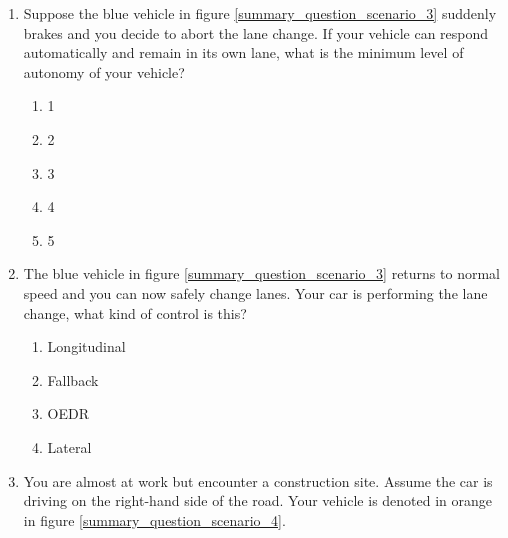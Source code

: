 \begin{enumerate}
\item  Suppose the blue vehicle in figure \ref{summary_question_scenario_3} suddenly brakes and you decide to abort the lane change. 
If your vehicle can respond automatically and remain in its own lane, what is the minimum level of autonomy of your vehicle?

\begin{enumerate}
\item 1
\item 2
\item 3
\item 4
\item 5
\end{enumerate}

\item The blue vehicle in figure \ref{summary_question_scenario_3} returns to normal speed and you can now safely change lanes. Your car is performing the lane change, what kind of control is this?

\begin{enumerate}
\item Longitudinal
\item Fallback
\item OEDR
\item Lateral
\end{enumerate}


\item You are almost at work but encounter a construction site. Assume the car is driving on the right-hand side of the road. 
Your vehicle is denoted in orange in  figure \ref{summary_question_scenario_4}.


\end{enumerate}
